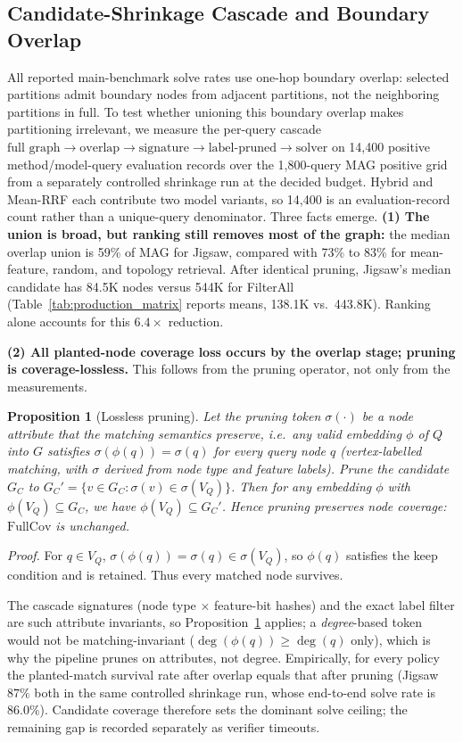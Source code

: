 \documentclass{article}
\newtheorem{proposition}{Proposition}
\begin{document}
\subsection{Candidate-Shrinkage Cascade and Boundary Overlap}
\label{sec:shrinkage}

All reported main-benchmark solve rates use one-hop boundary overlap: selected partitions admit boundary nodes from adjacent partitions, not the neighboring partitions in full. To test whether unioning this boundary overlap makes partitioning irrelevant, we measure the per-query cascade $\text{full graph} \to \text{overlap} \to \text{signature} \to \text{label-pruned} \to \text{solver}$ on 14{,}400 positive method/model-query evaluation records over the 1{,}800-query MAG positive grid from a separately controlled shrinkage run at the decided budget. Hybrid and Mean-RRF each contribute two model variants, so 14{,}400 is an evaluation-record count rather than a unique-query denominator. Three facts emerge. \textbf{(1) The union is broad, but ranking still removes most of the graph:} the median overlap union is 59\% of MAG for Jigsaw, compared with 73\% to 83\% for mean-feature, random, and topology retrieval. After identical pruning, Jigsaw's median candidate has 84.5K nodes versus 544K for FilterAll (Table~\ref{tab:production_matrix} reports means, 138.1K vs.\ 443.8K). Ranking alone accounts for this $6.4\times$ reduction.

\textbf{(2) All planted-node coverage loss occurs by the overlap stage; pruning is coverage-lossless.} This follows from the pruning operator, not only from the measurements.

\begin{proposition}[Lossless pruning]
\label{prop:lossless}
Let the pruning token $\sigma(\cdot)$ be a node attribute that the matching semantics preserve, i.e.\ any valid embedding $\phi$ of $Q$ into $G$ satisfies $\sigma(\phi(q))=\sigma(q)$ for every query node $q$ (vertex-labelled matching, with $\sigma$ derived from node type and feature labels). Prune the candidate $G_C$ to $G_C'=\{v\in G_C : \sigma(v)\in \sigma(V_Q)\}$. Then for any embedding $\phi$ with $\phi(V_Q)\subseteq G_C$, we have $\phi(V_Q)\subseteq G_C'$. Hence pruning preserves node coverage: $\mathrm{FullCov}$ is unchanged.
\end{proposition}
\noindent\emph{Proof.} For $q\in V_Q$, $\sigma(\phi(q))=\sigma(q)\in\sigma(V_Q)$, so $\phi(q)$ satisfies the keep condition and is retained. Thus every matched node survives.

The cascade signatures (node type $\times$ feature-bit hashes) and the exact label filter are such attribute invariants, so Proposition~\ref{prop:lossless} applies; a \emph{degree}-based token would not be matching-invariant ($\deg(\phi(q))\ge\deg(q)$ only), which is why the pipeline prunes on attributes, not degree. Empirically, for every policy the planted-match survival rate after overlap equals that after pruning (Jigsaw $87\%$ both in the same controlled shrinkage run, whose end-to-end solve rate is $86.0\%$). Candidate coverage therefore sets the dominant solve ceiling; the remaining gap is recorded separately as verifier timeouts.
\end{document}
